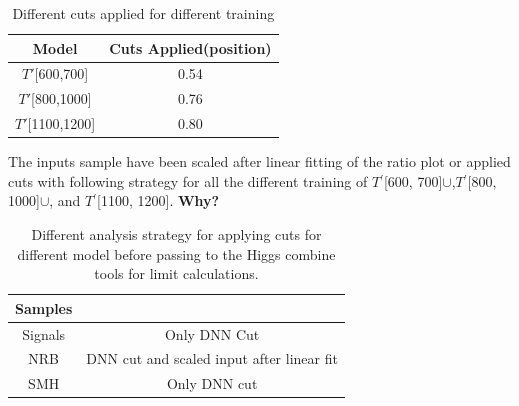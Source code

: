 \begin{table}[H]
    \centering
    \begin{tabular}{c|c} \hline
     Model &  Cuts Applied(position)\\\hline
      ${T'}$[600,700]   &  0.54\\
      $T'$[800,1000]   & 0.76 \\
      $T'$[1100,1200] & 0.80 \\\hline
    \end{tabular}
    \caption{Different cuts applied for different training}
    \label{tab:my_label_cuts}
\end{table}

The inputs sample have been scaled after linear fitting of the ratio plot or applied cuts with following strategy for all the different training of $T{^'}$[600, 700]$\cup$,$T{^'}$[800, 1000]$\cup$, and  $T{^'}$[1100, 1200]. \textbf{Why?}
\begin{table}[H]
    \centering
    \begin{tabular}{c|c}\hline
     Samples    &  \\\hline
     Signals    & Only DNN Cut \\
     NRB        & DNN cut and scaled input after linear fit \\
     SMH        & Only DNN cut \\\hline
    \end{tabular}
    \caption{Different analysis strategy for applying cuts for different model before passing to the Higgs combine tools for limit calculations.}
    \label{tab:my_label}
\end{table}






